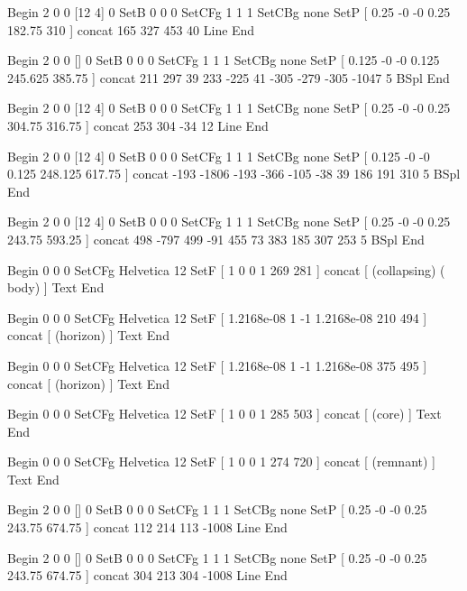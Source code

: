 Begin %
2 0 0 [12 4] 0 SetB
0 0 0 SetCFg
1 1 1 SetCBg
none SetP %
[ 0.25 -0 -0 0.25 182.75 310 ] concat
165 327 453 40 Line
End

Begin %
2 0 0 [] 0 SetB
0 0 0 SetCFg
1 1 1 SetCBg
none SetP %
[ 0.125 -0 -0 0.125 245.625 385.75 ] concat
211 297
39 233
-225 41
-305 -279
-305 -1047
5 BSpl
End

Begin %
2 0 0 [12 4] 0 SetB
0 0 0 SetCFg
1 1 1 SetCBg
none SetP %
[ 0.25 -0 -0 0.25 304.75 316.75 ] concat
253 304 -34 12 Line
End

Begin %
2 0 0 [12 4] 0 SetB
0 0 0 SetCFg
1 1 1 SetCBg
none SetP %
[ 0.125 -0 -0 0.125 248.125 617.75 ] concat
-193 -1806
-193 -366
-105 -38
39 186
191 310
5 BSpl
End

Begin %
2 0 0 [12 4] 0 SetB
0 0 0 SetCFg
1 1 1 SetCBg
none SetP %
[ 0.25 -0 -0 0.25 243.75 593.25 ] concat
498 -797
499 -91
455 73
383 185
307 253
5 BSpl
End

Begin %
0 0 0 SetCFg
Helvetica 12 SetF
[ 1 0 0 1 269 281 ] concat
[
(collapsing)
(   body)
] Text
End

Begin %
0 0 0 SetCFg
Helvetica 12 SetF
[ 1.2168e-08 1 -1 1.2168e-08 210 494 ] concat
[
(horizon)
] Text
End

Begin %
0 0 0 SetCFg
Helvetica 12 SetF
[ 1.2168e-08 1 -1 1.2168e-08 375 495 ] concat
[
(horizon)
] Text
End

Begin %
0 0 0 SetCFg
Helvetica 12 SetF
[ 1 0 0 1 285 503 ] concat
[
(core)
] Text
End

Begin %
0 0 0 SetCFg
Helvetica 12 SetF
[ 1 0 0 1 274 720 ] concat
[
(remnant)
] Text
End

Begin %
2 0 0 [] 0 SetB
0 0 0 SetCFg
1 1 1 SetCBg
none SetP %
[ 0.25 -0 -0 0.25 243.75 674.75 ] concat
112 214 113 -1008 Line
End

Begin %
2 0 0 [] 0 SetB
0 0 0 SetCFg
1 1 1 SetCBg
none SetP %
[ 0.25 -0 -0 0.25 243.75 674.75 ] concat
304 213 304 -1008 Line
End

